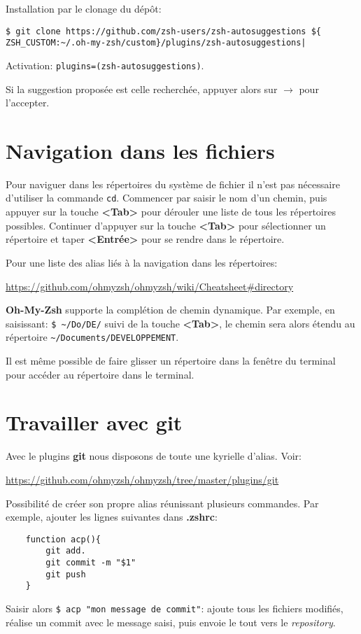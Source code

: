 \documentclass[a4paper,11pt]{article}
\begin{document}
Installation par le clonage du dépôt:
\begin{verbatim}
$ git clone https://github.com/zsh-users/zsh-autosuggestions ${
ZSH_CUSTOM:~/.oh-my-zsh/custom}/plugins/zsh-autosuggestions|
\end{verbatim}

Activation: \verb|plugins=(zsh-autosuggestions)|.

Si la suggestion proposée est celle recherchée, appuyer alors sur $\rightarrow$ pour l'accepter.
\medskip

\section{Navigation dans les fichiers}
Pour naviguer dans les répertoires du système de fichier il n'est pas nécessaire d'utiliser la commande \verb|cd|. Commencer par saisir le nom d'un chemin, puis appuyer sur la touche \textbf{<Tab>} pour dérouler une liste de tous les répertoires possibles. Continuer d'appuyer sur la touche \textbf{<Tab>} pour sélectionner un répertoire et taper \textbf{<Entrée>} pour se rendre dans le répertoire.
\medskip

Pour une liste des alias liés à la navigation dans les répertoires:

\url{https://github.com/ohmyzsh/ohmyzsh/wiki/Cheatsheet#directory}
\medskip

\textbf{Oh-My-Zsh} supporte la complétion de chemin dynamique. Par exemple, en saisissant: \verb|$ ~/Do/DE/| suivi de la touche \textbf{<Tab>}, le chemin sera alors étendu au répertoire \verb|~/Documents/DEVELOPPEMENT|.
\medskip

Il est même possible de faire glisser un répertoire dans la fenêtre du terminal pour accéder au répertoire dans le terminal.
\medskip

\section{Travailler avec \textbf{git}}
Avec le plugins \textbf{git} nous disposons de toute une kyrielle d'alias. Voir:

\url{https://github.com/ohmyzsh/ohmyzsh/tree/master/plugins/git}
\medskip

Possibilité de créer son propre alias réunissant plusieurs commandes. Par exemple, ajouter les lignes suivantes dans \textbf{.zshrc}:
\begin{verbatim}
	function acp(){
		git add.
		git commit -m "$1"
		git push
	}
\end{verbatim}
Saisir alors \verb|$ acp "mon message de commit"|: ajoute tous les fichiers modifiés, réalise un commit avec le message saisi, puis envoie le tout vers le \textit{repository}.
\end{document}
